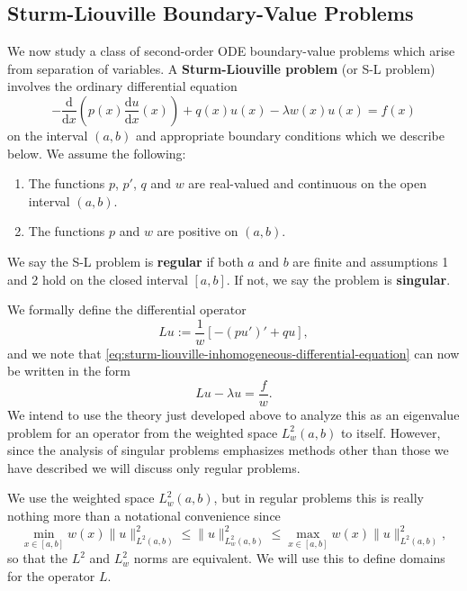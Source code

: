 \subsection{Sturm-Liouville Boundary-Value Problems}\label{sec:sturm-liouville-boundary-value-problems}

We now study a class of second-order ODE boundary-value problems which arise from separation of variables. A \textbf{Sturm-Liouville problem} (or S-L problem) involves the ordinary differential equation
\begin{equation}\label{eq:sturm-liouville-inhomogeneous-differential-equation}
-\frac{\mathrm{d}}{\mathrm{d}x}\left(p(x)\frac{\mathrm{d}u}{\mathrm{d}x}(x)\right)+q(x)u(x)-\lambda w(x)u(x)=f(x)
\end{equation}
on the interval $(a,b)$ and appropriate boundary conditions which we describe below. We assume the following:\begin{enumerate}\item The functions $p$, $p\prime$, $q$ and $w$ are real-valued and continuous on the open interval $(a,b)$.\item The functions $p$ and $w$ are positive on $(a,b)$.\end{enumerate}We say the S-L problem is \textbf{regular} if both $a$ and $b$ are finite and assumptions 1 and 2 hold on the closed interval $[a,b]$. If not, we say the problem is \textbf{singular}.

We formally define the differential operator
\begin{equation}\label{eq:sturm-liouville-weighted-differential-operator}
Lu:=\dfrac{1}{w}[-(pu')'+qu],
\end{equation}
and we note that \eqref{eq:sturm-liouville-inhomogeneous-differential-equation} can now be written in the form
\begin{equation}\label{eq:sturm-liouville-weighted-operator-equation}
Lu-\lambda u=\dfrac{f}{w}.
\end{equation}
We intend to use the theory just developed above to analyze this as an eigenvalue problem for an operator from the weighted space $L_w^2(a,b)$ to itself. However, since the analysis of singular problems emphasizes methods other than those we have described we will discuss only regular problems.

We use the weighted space $L_w^2(a,b)$, but in regular problems this is really nothing more than a notational convenience since
\begin{equation}\label{eq:sturm-liouville-weighted-norm-equivalence}
\min_{x\in[a,b]}w(x)\|u\|_{L^2(a,b)}^2\leq\|u\|_{L_w^2(a,b)}^2\leq\max_{x\in[a,b]}w(x)\|u\|_{L^2(a,b)}^2,
\end{equation}
so that the $L^2$ and $L_w^2$ norms are equivalent. We will use this to define domains for the operator $L$.

